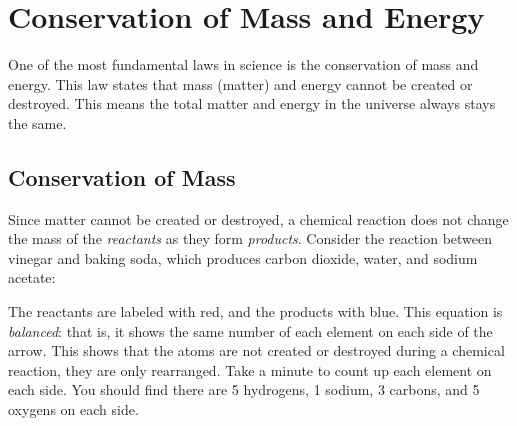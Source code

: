 \chapter{Conservation of Mass and Energy}

One of the most fundamental laws in science is the conservation of mass and 
energy. This law states that mass (matter) and energy cannot be created or 
destroyed. This means the total matter and energy in the universe always stays 
the same. 

\section{Conservation of Mass}
Since matter cannot be created or destroyed, a chemical reaction does not change 
the mass of the \textit{reactants} as they form \textit{products}. Consider the reaction between 
vinegar and baking soda, which produces carbon dioxide, water, and sodium acetate:

\begin{center}
\end{center}

The reactants are labeled with red, and the products with blue. This equation is
\textit{balanced}: that is, it shows the same number of each element on each side
of the arrow. This shows that the atoms are not created or destroyed during a 
chemical reaction, they are only rearranged. Take a minute to count up each 
element on each side. You should find there are 5 hydrogens, 1 sodium, 3 carbons,
and 5 oxygens on each side. 

